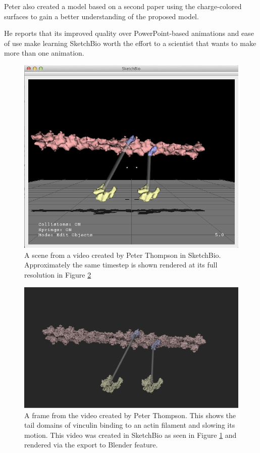 \documentclass[twocolumn]{bmcart}%
\begin{document}
Peter also created a model based on a second paper using the charge-colored surfaces to gain a better understanding of the proposed model.

He reports that its improved quality over PowerPoint-based animations and ease of use make learning SketchBio worth the effort to a scientist that wants to make more than one animation.

\begin{figure}[h]
\centering
\includegraphics[width=0.9\columnwidth]{peter_model.png}
\caption{A scene from a video created by Peter Thompson in SketchBio.
Approximately the same timestep is shown rendered at its full resolution in Figure \ref{fig:peter_video}}
\label{fig:peter_model}
\end{figure}

\begin{figure}[h!]
\centering
\includegraphics[width=0.9\columnwidth]{peter_video.png}
\caption{A frame from the video created by Peter Thompson.  This shows the tail domains of vinculin binding to an actin filament and slowing its motion.
This video was created in SketchBio as seen in Figure \ref{fig:peter_model} and rendered via the export to Blender feature.}
\label{fig:peter_video}
\end{figure}
\end{document}
